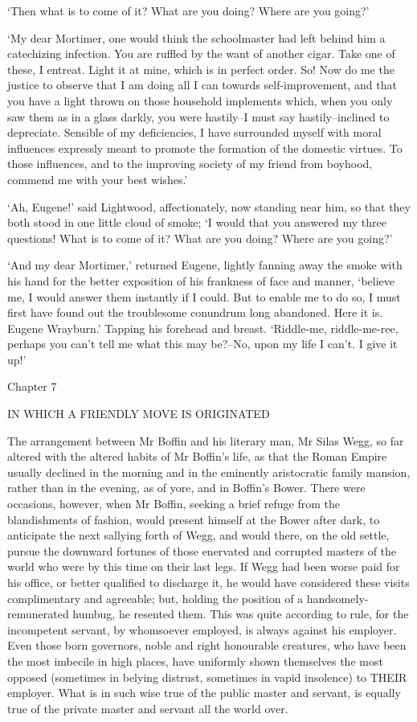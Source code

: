 ‘Then what is to come of it? What are you doing? Where are you going?’

‘My dear Mortimer, one would think the schoolmaster had left behind him
a catechizing infection. You are ruffled by the want of another cigar.
Take one of these, I entreat. Light it at mine, which is in perfect
order. So! Now do me the justice to observe that I am doing all I can
towards self-improvement, and that you have a light thrown on those
household implements which, when you only saw them as in a glass darkly,
you were hastily--I must say hastily--inclined to depreciate. Sensible
of my deficiencies, I have surrounded myself with moral influences
expressly meant to promote the formation of the domestic virtues.
To those influences, and to the improving society of my friend from
boyhood, commend me with your best wishes.’

‘Ah, Eugene!’ said Lightwood, affectionately, now standing near him,
so that they both stood in one little cloud of smoke; ‘I would that you
answered my three questions! What is to come of it? What are you doing?
Where are you going?’

‘And my dear Mortimer,’ returned Eugene, lightly fanning away the smoke
with his hand for the better exposition of his frankness of face and
manner, ‘believe me, I would answer them instantly if I could. But
to enable me to do so, I must first have found out the troublesome
conundrum long abandoned. Here it is. Eugene Wrayburn.’ Tapping his
forehead and breast. ‘Riddle-me, riddle-me-ree, perhaps you can’t tell
me what this may be?--No, upon my life I can’t. I give it up!’



Chapter 7

IN WHICH A FRIENDLY MOVE IS ORIGINATED


The arrangement between Mr Boffin and his literary man, Mr Silas Wegg,
so far altered with the altered habits of Mr Boffin’s life, as that
the Roman Empire usually declined in the morning and in the eminently
aristocratic family mansion, rather than in the evening, as of yore,
and in Boffin’s Bower. There were occasions, however, when Mr Boffin,
seeking a brief refuge from the blandishments of fashion, would present
himself at the Bower after dark, to anticipate the next sallying
forth of Wegg, and would there, on the old settle, pursue the downward
fortunes of those enervated and corrupted masters of the world who were
by this time on their last legs. If Wegg had been worse paid for his
office, or better qualified to discharge it, he would have considered
these visits complimentary and agreeable; but, holding the position of
a handsomely-remunerated humbug, he resented them. This was quite
according to rule, for the incompetent servant, by whomsoever employed,
is always against his employer. Even those born governors, noble and
right honourable creatures, who have been the most imbecile in high
places, have uniformly shown themselves the most opposed (sometimes in
belying distrust, sometimes in vapid insolence) to THEIR employer. What
is in such wise true of the public master and servant, is equally true
of the private master and servant all the world over.

